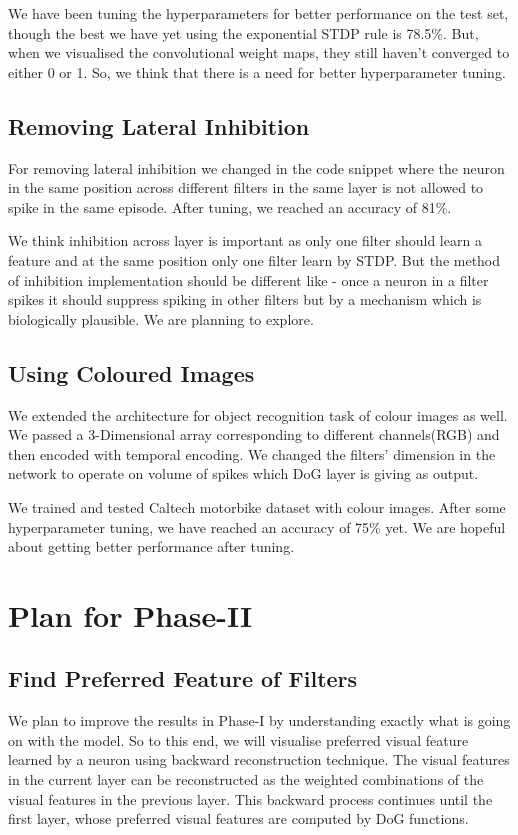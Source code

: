 \documentclass[conference]{IEEEtran}
\begin{document}
We have been tuning the hyperparameters for better performance on the test set, though the best we have yet using the exponential STDP rule is 78.5\%. But, when we visualised the convolutional weight maps, they still haven't converged to either 0 or 1. So, we think that there is a need for better hyperparameter tuning.

\subsection{Removing Lateral Inhibition}
For removing lateral inhibition we changed in the code snippet where the neuron in the same position across different filters in the same layer is not allowed to spike in the same episode. After tuning, we reached an accuracy of 81\%.

We think inhibition across layer is important as only one filter should learn a feature and at the same position only one filter learn by STDP. But the method of inhibition implementation should be different like - once a neuron in a filter spikes it should suppress spiking in other filters but by a mechanism which is biologically plausible. We are planning to explore.  

\subsection{Using Coloured Images}
We extended the architecture for object recognition task of colour images as well. We passed a 3-Dimensional array corresponding to different channels(RGB) and then encoded with temporal encoding. We changed the filters' dimension in the network to operate on volume of spikes which DoG layer is giving as output.

We trained and tested Caltech motorbike dataset with colour images. After some hyperparameter tuning, we have reached an accuracy of 75\% yet. We are hopeful about getting better performance after tuning. 

\section{Plan for Phase-II}
\subsection{Find Preferred Feature of Filters}
We plan to improve the results in Phase-I by understanding exactly what is going on with the model. So to this end, we will visualise preferred visual feature learned by a neuron using
backward reconstruction technique. The visual features in the current layer can be reconstructed as the weighted combinations of the visual features in the previous layer. This backward process continues until the first layer, whose preferred visual features are computed by DoG functions.
\end{document}
